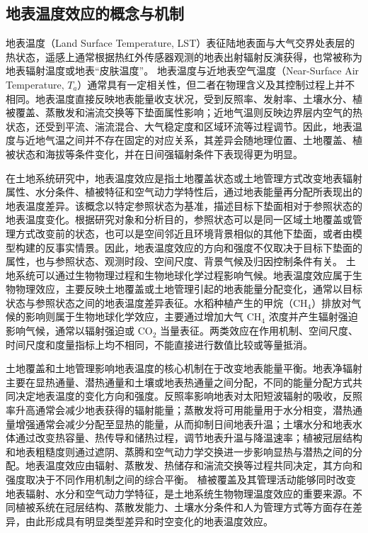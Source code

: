 \subsection{地表温度效应的概念与机制}
地表温度（Land Surface Temperature, LST）表征陆地表面与大气交界处表层的热状态，遥感上通常根据热红外传感器观测的地表出射辐射反演获得，也常被称为地表辐射温度或地表“皮肤温度”\cite{Li2013RSELST}。
地表温度与近地表空气温度（Near-Surface Air Temperature, $T_a$）通常具有一定相关性，但二者在物理含义及其控制过程上并不相同。地表温度直接反映地表能量收支状况，受到反照率、发射率、土壤水分、植被覆盖、蒸散发和湍流交换等下垫面属性影响；近地气温则反映边界层内空气的热状态，还受到平流、湍流混合、大气稳定度和区域环流等过程调节。因此，地表温度与近地气温之间并不存在固定的对应关系，其差异会随地理位置、土地覆盖、植被状态和海拔等条件变化，并在日间强辐射条件下表现得更为明显\cite{Good2017JGR}。

在土地系统研究中，地表温度效应是指土地覆盖状态或土地管理方式改变地表辐射属性、水分条件、植被特征和空气动力学特性后，通过地表能量再分配所表现出的地表温度差异\cite{Bright2017LCMC,Duveiller2018Energy}。该概念以特定参照状态为基准，描述目标下垫面相对于参照状态的地表温度变化。根据研究对象和分析目的，参照状态可以是同一区域土地覆盖或管理方式改变前的状态，也可以是空间邻近且环境背景相似的其他下垫面，或者由模型构建的反事实情景。因此，地表温度效应的方向和强度不仅取决于目标下垫面的属性，也与参照状态、观测时段、空间尺度、背景气候及归因控制条件有关。
土地系统可以通过生物物理过程和生物地球化学过程影响气候。地表温度效应属于生物物理效应，主要反映土地覆盖或土地管理引起的地表能量分配变化，通常以目标状态与参照状态之间的地表温度差异表征\cite{Bright2017LCMC,Duveiller2018Energy}。水稻种植产生的甲烷（CH$_4$）排放对气候的影响则属于生物地球化学效应，主要通过增加大气 CH$_4$ 浓度并产生辐射强迫影响气候，通常以辐射强迫或 CO$_2$ 当量表征\cite{Qian2023RiceGHG,Zhang2020NatCommun}。两类效应在作用机制、空间尺度、时间尺度和度量指标上均不相同，不能直接进行数值比较或等量抵消。

土地覆盖和土地管理影响地表温度的核心机制在于改变地表能量平衡。地表净辐射主要在显热通量、潜热通量和土壤或地表热通量之间分配，不同的能量分配方式共同决定地表温度的变化方向和强度。反照率影响地表对太阳短波辐射的吸收，反照率升高通常会减少地表获得的辐射能量\cite{Bonan2008Science}；蒸散发将可用能量用于水分相变，潜热通量增强通常会减少分配至显热的能量，从而抑制日间地表升温\cite{Bright2017LCMC}；土壤水分和地表水体通过改变热容量、热传导和储热过程，调节地表升温与降温速率\cite{Duveiller2018Energy}；植被冠层结构和地表粗糙度则通过遮阴、蒸腾和空气动力学交换进一步影响显热与潜热之间的分配\cite{Bright2017LCMC,Chen2024Croplands}。地表温度效应由辐射、蒸散发、热储存和湍流交换等过程共同决定，其方向和强度取决于不同作用机制之间的综合平衡。
植被覆盖及其管理活动能够同时改变地表辐射、水分和空气动力学特征，是土地系统生物物理温度效应的重要来源。不同植被系统在冠层结构、蒸散发能力、土壤水分条件和人为管理方式等方面存在差异，由此形成具有明显类型差异和时空变化的地表温度效应。

